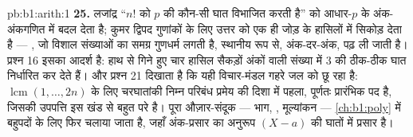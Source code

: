 \begin{solution}{pb:b1:arith:1}
\textbf{25.} लजांद्र ``$n!$ को $p$ की कौन-सी घात विभाजित करती है'' को
आधार-$p$ के अंक-अंकगणित में बदल देता है; कुमर द्विपद गुणांकों के लिए उत्तर
को एक ही जोड़ के हासिलों में सिकोड़ देता है --- , जो विशाल संख्याओं
का समग्र गुणधर्म लगती है, स्थानीय रूप से, अंक-दर-अंक, पढ़ ली जाती है। प्रश्न
16 इसका आदर्श है: हाथ से गिने हुए चार हासिल सैकड़ों अंकों वाली संख्या में
$3$ की ठीक-ठीक घात निर्धारित कर देते हैं। और प्रश्न 21 दिखाता है कि यही
विचार-मंडल गहरे जल को छू रहा है: $\operatorname{lcm}(1, \dots, 2n)$ के लिए
चरघातांकी निम्न परिबंध  प्रमेय की दिशा में पहला, पूर्णतः
प्रारंभिक पद है, जिसकी उपपत्ति इस खंड से बहुत परे है। पूरा औज़ार-संदूक ---
भाग, , मूल्यांकन --- \cref{ch:b1:poly} में बहुपदों के लिए
फिर चलाया जाता है, जहाँ अंक-प्रसार का अनुरूप $(X - a)$ की घातों में प्रसार
है।
\end{solution}
